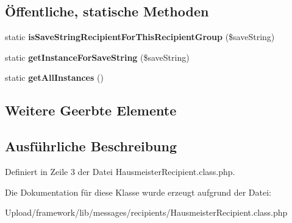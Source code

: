 \subsection*{Öffentliche, statische Methoden}
\begin{DoxyCompactItemize}
\item 
\mbox{\label{class_hausmeister_recipient_acb8bda8aa4069e7044d46e46221951f0}} 
static {\bfseries is\+Save\+String\+Recipient\+For\+This\+Recipient\+Group} (\$save\+String)
\item 
\mbox{\label{class_hausmeister_recipient_af9e8f7c0ed747307295500fbdb7a924d}} 
static {\bfseries get\+Instance\+For\+Save\+String} (\$save\+String)
\item 
\mbox{\label{class_hausmeister_recipient_a33e885721342b157cc10abd2ff2ec3e9}} 
static {\bfseries get\+All\+Instances} ()
\end{DoxyCompactItemize}
\subsection*{Weitere Geerbte Elemente}


\subsection{Ausführliche Beschreibung}


Definiert in Zeile 3 der Datei Hausmeister\+Recipient.\+class.\+php.



Die Dokumentation für diese Klasse wurde erzeugt aufgrund der Datei\+:\begin{DoxyCompactItemize}
\item 
Upload/framework/lib/messages/recipients/Hausmeister\+Recipient.\+class.\+php\end{DoxyCompactItemize}
